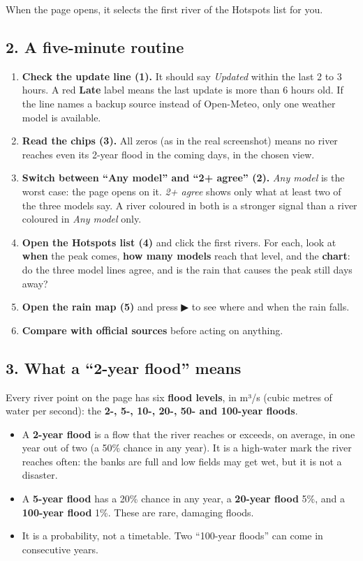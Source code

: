 \documentclass[
  10pt,
]{article}
\providecommand{\tightlist}{%
  \setlength{\itemsep}{0pt}\setlength{\parskip}{0pt}}
\begin{document}
When the page opens, it selects the first river of the Hotspots list for
you.

\hypertarget{a-five-minute-routine}{%
\subsection{2. A five-minute routine}\label{a-five-minute-routine}}

\begin{enumerate}
\def\labelenumi{\arabic{enumi}.}
\tightlist
\item
  \textbf{Check the update line (1).} It should say \emph{Updated}
  within the last 2 to 3 hours. A red \textbf{Late} label means the last
  update is more than 6 hours old. If the line names a backup source
  instead of Open-Meteo, only one weather model is available.
\item
  \textbf{Read the chips (3).} All zeros (as in the real screenshot)
  means no river reaches even its 2-year flood in the coming days, in
  the chosen view.
\item
  \textbf{Switch between ``Any model'' and ``2+ agree'' (2).} \emph{Any
  model} is the worst case: the page opens on it. \emph{2+ agree} shows
  only what at least two of the three models say. A river coloured in
  both is a stronger signal than a river coloured in \emph{Any model}
  only.
\item
  \textbf{Open the Hotspots list (4)} and click the first rivers. For
  each, look at \textbf{when} the peak comes, \textbf{how many models}
  reach that level, and the \textbf{chart}: do the three model lines
  agree, and is the rain that causes the peak still days away?
\item
  \textbf{Open the rain map (5)} and press ▶ to see where and when the
  rain falls.
\item
  \textbf{Compare with official sources} before acting on anything.
\end{enumerate}

\hypertarget{what-a-2-year-flood-means}{%
\subsection{3. What a ``2-year flood''
means}\label{what-a-2-year-flood-means}}

Every river point on the page has six \textbf{flood levels}, in m³/s
(cubic metres of water per second): the \textbf{2-, 5-, 10-, 20-, 50-
and 100-year floods}.

\begin{itemize}
\tightlist
\item
  A \textbf{2-year flood} is a flow that the river reaches or exceeds,
  on average, in one year out of two (a 50\% chance in any year). It is
  a high-water mark the river reaches often: the banks are full and low
  fields may get wet, but it is not a disaster.
\item
  A \textbf{5-year flood} has a 20\% chance in any year, a
  \textbf{20-year flood} 5\%, and a \textbf{100-year flood} 1\%. These
  are rare, damaging floods.
\item
  It is a probability, not a timetable. Two ``100-year floods'' can come
  in consecutive years.
\end{itemize}
\end{document}
